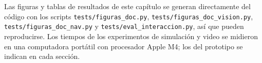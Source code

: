 Las figuras y tablas de resultados de este capítulo se generan directamente del código
con los scripts \texttt{tests/figuras\_doc.py}, \texttt{tests/figuras\_doc\_vision.py},
\texttt{tests/figuras\_doc\_nav.py} y \texttt{tests/eval\_interaccion.py}, así que
pueden reproducirse. Los tiempos de los experimentos de simulación y video se midieron
en una computadora portátil con procesador Apple M4; los del prototipo se indican en
cada sección.


















